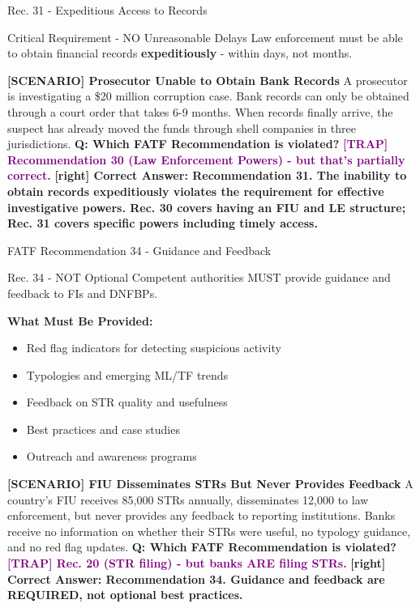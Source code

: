\documentclass[11pt,a4paper]{beamer}
\newcommand{\trap}[1]{\textcolor{purple}{\textbf{[TRAP] #1}}}
\newcommand{\correct}[1]{\textcolor{green!50!black}{\textbf{[right] #1}}}
\newcommand{\scenario}[1]{\textcolor{blue!70!black}{\textbf{[SCENARIO] #1}}}
\begin{document}
\begin{frame}{Rec. 31 - Expeditious Access to Records}
\begin{block}{Critical Requirement - NO Unreasonable Delays}
Law enforcement must be able to obtain financial records \textbf{expeditiously} - within days, not months.
\end{block}
\scenario{Prosecutor Unable to Obtain Bank Records}
A prosecutor is investigating a \$20 million corruption case. Bank records can only be obtained through a court order that takes 6-9 months. When records finally arrive, the suspect has already moved the funds through shell companies in three jurisdictions.
\vspace{0.2cm}
\textbf{Q: Which FATF Recommendation is violated?}
\trap{Recommendation 30 (Law Enforcement Powers) - but that's partially correct.}
\correct{Correct Answer: Recommendation 31. The inability to obtain records expeditiously violates the requirement for effective investigative powers. Rec. 30 covers having an FIU and LE structure; Rec. 31 covers specific powers including timely access.}
\end{frame}


\begin{frame}{FATF Recommendation 34 - Guidance and Feedback}
\begin{block}{Rec. 34 - NOT Optional}
Competent authorities MUST provide guidance and feedback to FIs and DNFBPs.
\end{block}
\textbf{What Must Be Provided:}
\begin{itemize}
\item Red flag indicators for detecting suspicious activity
\item Typologies and emerging ML/TF trends
\item Feedback on STR quality and usefulness
\item Best practices and case studies
\item Outreach and awareness programs
\end{itemize}
\scenario{FIU Disseminates STRs But Never Provides Feedback}
A country's FIU receives 85,000 STRs annually, disseminates 12,000 to law enforcement, but never provides any feedback to reporting institutions. Banks receive no information on whether their STRs were useful, no typology guidance, and no red flag updates.
\vspace{0.2cm}
\textbf{Q: Which FATF Recommendation is violated?}
\trap{Rec. 20 (STR filing) - but banks ARE filing STRs.}
\correct{Correct Answer: Recommendation 34. Guidance and feedback are REQUIRED, not optional best practices.}
\end{frame}
\end{document}
